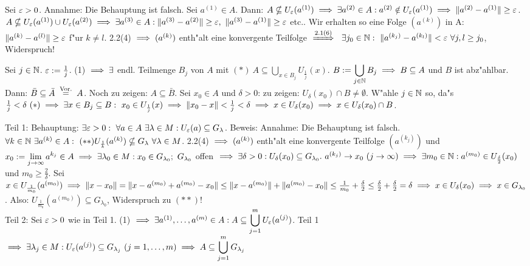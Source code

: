 \documentclass[a4paper,twoside,DIV15,BCOR12mm]{scrbook}
\begin{document}
\begin{beweise}
\item Sei $\varepsilon>0$. Annahme: Die Behauptung ist falsch. Sei $a^{(1)}\in A$. Dann: $A\nsubseteq U_{\varepsilon}(a^{(1)})\implies\exists a^{(2)}\in A: a^{(2)}\notin U_\varepsilon(a^{(1)})\implies\|a^{(2)}-a^{(1)}\|\ge\varepsilon$. $A\nsubseteq U_\ep(a^{(1)})\cup U_\ep(a^{(2)})\folgt\exists a^{(3)} \in A: \|a^{(3)}-a^{(2)}\|\ge\ep,\ \|a^{(3)}-a^{(1)}\|\ge\ep$ etc.. Wir erhalten so eine Folge $(a^{(k)})$ in A: $\|a^{(k)}-a^{(l)}\|\ge\varepsilon$ f"ur $k\ne l$. 2.2(4) $\implies (a^{(k)})$ enth"alt eine konvergente Teilfolge $\folgtnach{2.1(6)}\ \exists j_0 \in\MdN:\ \|a^{(k_j)}-a^{(k_l)}\|<\ep\ \forall j,l\ge j_0$, Widerspruch!
\item Sei $j\in\mathbb{N}$. $\varepsilon:=\frac{1}{j}$. (1) $\implies\exists$ endl. Teilmenge $B_j$ von $A$ mit $(*)\ A\subseteq \displaystyle\bigcup_{x \in B_j}U_{\frac{1}{j}}(x)$. $B:=\displaystyle\bigcup_{j\in\mathbb{N}}B_j\implies B\subseteq A$ und $B$ ist abz"ahlbar. Dann: $\bar B\subseteq\bar A\gleichnach{Vor.}A$. Noch zu zeigen: $A\subseteq\bar B$. Sei $x_0\in A$ und $\delta>0$: zu zeigen: $U_\delta(x_0)\cap B\ne\emptyset$. W"ahle $j\in\mathbb{N}$ so, da"s $\frac{1}{j}<\delta\ (*)\implies\exists x \in B_j\subseteq B:\ x_0\in U_{\frac{1}{j}}(x)\implies \|x_0-x\|<\frac{1}{j}<\delta\implies x\in U_\delta(x_0)\implies x\in U_\delta(x_0)\cap B$.
\item Teil 1: Behauptung: $\exists \ep>0:\ \forall a \in A\ \exists\lambda\in M: U_\ep(a)\subseteq G_\lambda$. Beweis: Annahme: Die Behauptung ist falsch. $\forall k\in\mathbb{N}\ \exists a^{(k)}\in A:\ (**) U_{\frac{1}{k}}(a^{(k)})\nsubseteq G_\lambda\ \forall \lambda\in M$. 2.2(4) $\implies (a^{(k)})$ enth"alt eine konvergente Teilfolge $(a^{(k_j)})$ und $x_0:=\displaystyle\lim_{j\to\infty}a^{k_j}\in A\folgt\exists \lambda_0\in M: x_0 \in G_{\lambda_0};\ G_{\lambda_0}$ offen $\folgt\exists \delta>0: U_\delta(x_0)\subseteq G_{\lambda_0}.\ a^{(k_j)}\to x_0\ (j\to\infty)\folgt\exists m_0\in\MdN: a^{(m_0)}\in U_{\frac{\delta}{2}}(x_0)$ und $m_0\ge\frac{2}{\delta}$. Sei $x\in U_{\frac{1}{m_0}}(a^{(m_0)})\implies \|x-x_0\|=\|x-a^{(m_0)}+a^{(m_0)}-x_0\|\le\|x-a^{(m_0)}\|+\|a^{(m_0)}-x_0\|\le\frac{1}{m_0}+\frac{\delta}{2}\le\frac{\delta}{2}+\frac{\delta}{2}=\delta\implies x\in U_\delta(x_0)\implies x \in G_{\lambda_0}$. Also: $U_{\frac{1}{m_0}}(a^{(m_0)})\subseteq G_{\lambda_0}$, Widerspruch zu $(**)$!\\
Teil 2: Sei $\varepsilon>0$ wie in Teil 1. (1) $\implies\exists a^{(1)},\ldots,a^{(m)}\in A: A\subseteq\displaystyle\bigcup_{j=1}^mU_\varepsilon(a^{(j)})$. Teil 1 $\implies\exists \lambda_j\in M: U_\varepsilon(a^{(j)})\subseteq G_{\lambda_j}\ (j=1,\ldots,m)\implies A\subseteq \displaystyle\bigcup_{j=1}^m G_{\lambda_j}$ 
\end{beweise}
\end{document}
